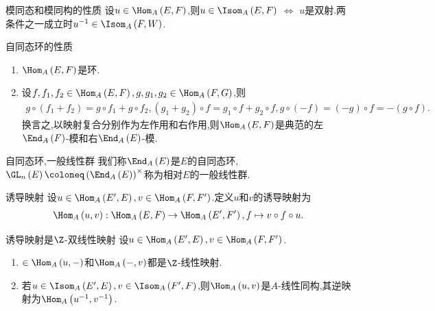 \begin{proposition}{模同态和模同构的性质}{}
	设$u\in\Hom_{A}\left(E,F\right)$,则$u\in\Isom_{A}\left(E,F\right)$ $\iff$ $u$是双射.两条件之一成立时$u^{-1}\in\Isom_{A}\left(F,W\right)$.
\end{proposition}

\begin{proposition}{自同态环的性质}{}
	\begin{enumerate}
		\item $\Hom_{A}\left(E,F\right)$是环.
		\item 设$f,f_{1},f_{2}\in\Hom_{A}\left(E,F\right),g,g_{1},g_{2}\in\Hom_{A}\left(F,G\right)$,则
		\begin{align*}
			g\circ\left(f_{1}+f_{2}\right)=g\circ f_{1}+g\circ f_{2},\left(g_{1}+g_{2}\right)\circ f=g_{1}\circ f+g_{2}\circ f,g\circ\left(-f\right)=\left(-g\right)\circ f=-\left(g\circ f\right).
		\end{align*}
		换言之,以映射复合分别作为左作用和右作用,则$\Hom_{A}\left(E,F\right)$是典范的左$\End_{{A}}\left(F\right)$-模和右$\End_{{A}}\left(E\right)$-模.
	\end{enumerate}
\end{proposition}

\begin{definition}{自同态环,一般线性群}{}
	我们称$\End_{{A}}\left(E\right)$是$E$的自同态环,$\GL_{n}\left(E\right)\coloneq\left(\End_{{A}}\left(E\right)\right)^{\times}$称为相对$E$的一般线性群.
\end{definition}

\begin{definition}{诱导映射}{}
	设$u\in\Hom_{A}\left(E^{\prime},E\right),v\in\Hom_{A}\left(F,F^{\prime}\right)$.定义$u$和$v$的诱导映射为
	\begin{align*}
		\Hom_{A}\left(u,v\right):\Hom_{A}\left(E,F\right)\to\Hom_{A}\left(E^{\prime},F^{\prime}\right),f\mapsto v\circ f\circ u.
	\end{align*}
\end{definition}

\begin{proposition}{诱导映射是$\Z$-双线性映射}{}
	设$u\in\Hom_{A}\left(E^{\prime},E\right),v\in\Hom_{A}\left(F,F^{\prime}\right)$.
	\begin{enumerate}
		\item $\in\Hom_{A}\left(u,-\right)$和$\Hom_{A}\left(-,v\right)$都是$\Z$-线性映射.
		\item 若$u\in\Isom_{A}\left(E^{\prime},E\right),v\in\Isom_{A}\left(F^{\prime},F\right)$,则$\Hom_{A}\left(u,v\right)$是$A$-线性同构,其逆映射为$\Hom_{A}\left(u^{-1},v^{-1}\right)$.
	\end{enumerate}
\end{proposition}

